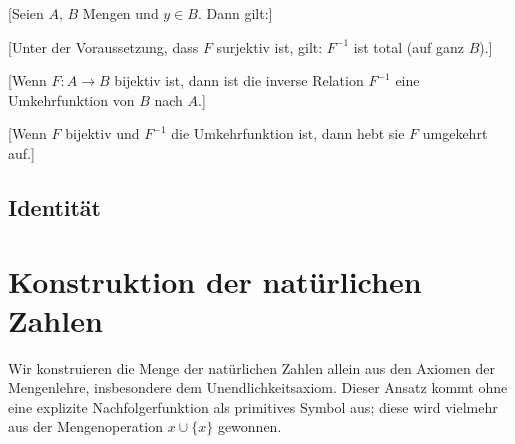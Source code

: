 \documentclass[main.tex]{subfiles}
\begin{document}
%
[Seien \(A,\,B\) Mengen und \(y\in B\). Dann gilt:]
\begin{tabproof}
  
\end{tabproof}


[Unter der Voraussetzung, dass \(F\) surjektiv ist, gilt: \(F^{-1}\) ist total (auf ganz \(B\)).]

[Wenn \(F\colon A \to B\) bijektiv ist, dann ist die inverse Relation \(F^{-1}\) eine Umkehrfunktion von \(B\) nach \(A\).]

[Wenn \(F\) bijektiv und \(F^{-1}\) die Umkehrfunktion ist, dann hebt sie \(F\) umgekehrt auf.]


\section{Identität}


\chapter{Konstruktion der natürlichen Zahlen}

Wir konstruieren die Menge der natürlichen Zahlen allein aus den Axiomen der Mengenlehre, insbesondere dem Unendlichkeitsaxiom.  Dieser Ansatz kommt ohne eine explizite Nachfolgerfunktion als primitives Symbol aus; diese wird vielmehr aus der Mengenoperation \(x \cup \{x\}\) gewonnen.

\end{document}
